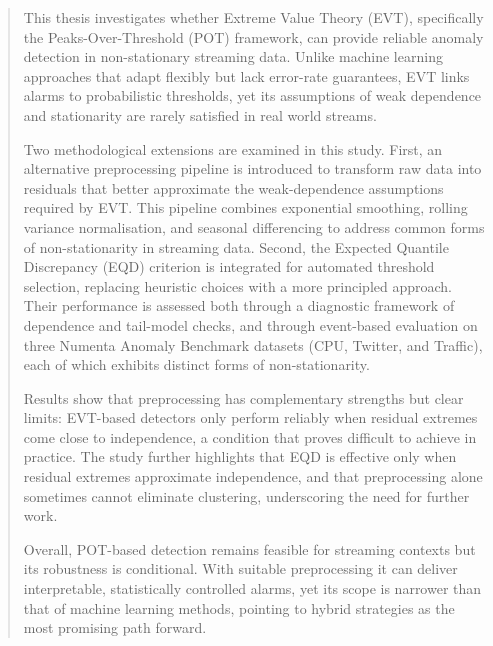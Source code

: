 \documentclass{statsmsc}
\begin{document}
\begin{abstract}
    This thesis investigates whether Extreme Value Theory (EVT), specifically the Peaks-Over-Threshold (POT) framework,
    can provide reliable anomaly detection in non-stationary streaming data. Unlike machine learning approaches that adapt
    flexibly but lack error-rate guarantees, EVT links alarms to probabilistic thresholds, yet its assumptions of weak 
    dependence and stationarity are rarely satisfied in real world streams.

    Two methodological extensions are examined in this study. First, an alternative preprocessing pipeline is introduced to 
    transform raw data into residuals that better approximate the weak-dependence assumptions required by EVT. This pipeline 
    combines exponential smoothing, rolling variance normalisation, and seasonal differencing to address common forms of 
    non-stationarity in streaming data. Second, the Expected Quantile Discrepancy (EQD) criterion is integrated for automated 
    threshold selection, replacing heuristic choices with a more principled approach. Their performance is assessed both 
    through a diagnostic framework of dependence and tail-model checks, and through event-based evaluation on three
    Numenta Anomaly Benchmark datasets (CPU, Twitter, and Traffic), each of which exhibits distinct forms of non-stationarity.

    Results show that preprocessing has complementary strengths but clear limits: EVT-based detectors only perform reliably 
    when residual extremes come close to independence, a condition
    that proves difficult to achieve in practice. The study further highlights that EQD is effective only when residual 
    extremes approximate independence, and that preprocessing alone sometimes cannot eliminate clustering, underscoring 
    the need for further work.

    Overall, POT-based detection remains feasible for streaming contexts but its robustness is conditional. With suitable 
    preprocessing it can deliver interpretable, statistically controlled alarms, yet its scope is narrower than that of 
    machine learning methods, pointing to hybrid strategies as the most promising path forward.
\end{abstract}

%
%
\vspace{4cm}
\end{document}
